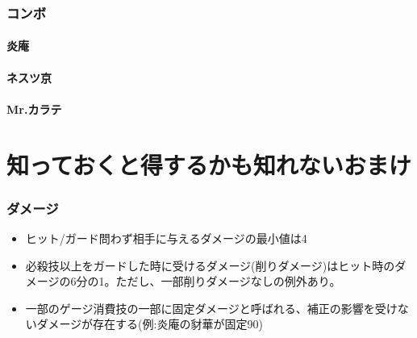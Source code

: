 \documentclass[a4j,11pt]{jarticle}
\begin{document}
\section{コンボ}
\subsection{炎庵}
\subsection{ネスツ京}
\subsection{Mr.カラテ}

\part{知っておくと得するかも知れないおまけ}
\section{ダメージ}
\begin{itemize}
  \item ヒット/ガード問わず相手に与えるダメージの最小値は4
  \item 必殺技以上をガードした時に受けるダメージ(削りダメージ)はヒット時のダメージの6分の1。ただし、一部削りダメージなしの例外あり。
  \item 一部のゲージ消費技の一部に固定ダメージと呼ばれる、補正の影響を受けないダメージが存在する(例:炎庵の豺華が固定90)
\end{itemize}
\end{document}
